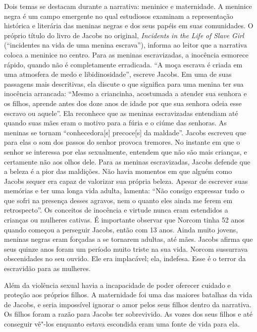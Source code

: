Dois temas se destacam durante a narrativa: meninice e maternidade. A
meninice negra é um campo emergente no qual estudiosos examinam a
representação histórica e literária das meninas negras e dos seus papéis
em suas comunidades. O próprio título do
livro de Jacobs no original, \emph{Incidents in the Life of Slave Girl}
(``incidentes na vida de uma menina escrava''), informa ao leitor que a
narrativa coloca a meninice no centro. Para as meninas escravizadas, a
inocência esmorece rápido, quando não é completamente erradicada. ``A
moça escrava é criada em uma atmosfera de medo e libidinosidade'',
escreve Jacobs. Em uma de suas passagens mais descritivas, ela discute o
que significa para uma menina ter sua inocência arrancada: ``Mesmo a
criancinha, acostumada a atender
sua senhora e os filhos, aprende antes dos doze anos de idade por que
sua senhora odeia esse escravo ou aquele''. Ela reconhece que as meninas
escravizadas entendiam até quando suas mães eram o motivo para a fúria e
o ciúme das senhoras. As meninas se tornam
``conhecedora{[}s{]} precoce{[}s{]} da maldade''. Jacobs escreveu que
para elas o som dos passos do senhor provoca
tremores. No instante em que o senhor se interessa por elas sexualmente,
entendem que não são mais crianças, e certamente
não aos olhos dele. Para as meninas escravizadas, Jacobs defende que a
beleza é a pior das maldições. Não havia momentos em que alguém como
Jacobs sequer era capaz de valorizar sua própria beleza. Apesar de
escrever suas memórias e ter uma longa vida adulta, lamenta:
``Não consigo expressar tudo o que sofri na presença desses agravos, nem
o quanto eles ainda me ferem em retrospecto''. Os conceitos de inocência
e virtude nunca eram estendidos a crianças ou mulheres cativas. É
importante observar que Norcom tinha 52 anos quando começou a perseguir
Jacobs, então com 13 anos. Ainda muito jovens, meninas negras eram
forçadas a se tornarem adultas, até mães. Jacobs afirma que seus quinze
anos foram um período muito triste na sua vida. Norcom
sussurrava obscenidades no seu ouvido. Ele era implacável; ela,
indefesa. Esse é o terror da escravidão para as mulheres.

Além da violência sexual havia a incapacidade de poder oferecer cuidado
e proteção aos próprios filhos. A maternidade foi uma das maiores
batalhas da vida de Jacobs, e seria impossível ignorar o amor pelos seus
filhos dentro da narrativa. Os filhos foram a razão para Jacobs ter
sobrevivido. As vozes dos seus filhos e até conseguir
vê"-los enquanto estava escondida eram uma fonte de vida para ela.

